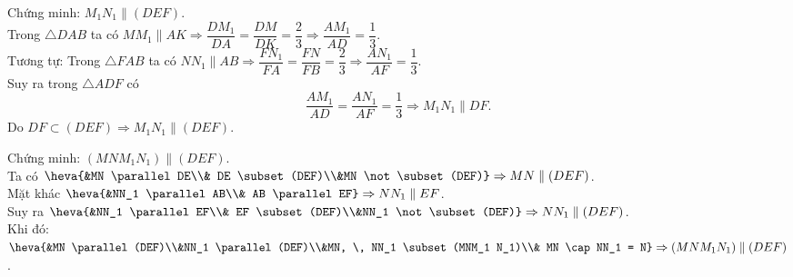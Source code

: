 \begin{bt}
{\begin{listEX}
{\begin{tikzpicture}[line join=round,line cap=round,line width=.6pt,font=\footnotesize,scale=1]
	\end{tikzpicture}}
\item Chứng minh: $M_1 N_1 \parallel (DEF)$.\\
Trong $\triangle DAB$ ta có $MM_1 \parallel AK \Rightarrow \dfrac{DM_1}{DA} = \dfrac{DM}{DK} = \dfrac{2}{3} \Rightarrow \dfrac{AM_1}{AD} = \dfrac{1}{3}$.\\
Tương tự: Trong $\triangle FAB$ ta có $NN_1 \parallel AB \Rightarrow \dfrac{FN_1}{FA} = \dfrac{FN}{FB} = \dfrac{2}{3} \Rightarrow \dfrac{AN_1}{AF} = \dfrac{1}{3}$.\\
Suy ra trong $\triangle ADF$ có $$\dfrac{AM_1}{AD} = \dfrac{AN_1}{AF} = \dfrac{1}{3} \Rightarrow M_1N_1 \parallel DF.$$
Do $DF \subset (DEF) \Rightarrow M_1N_1 \parallel  (DEF)$.
\item Chứng minh: $(MNM_1 N_1) \parallel (DEF)$.\\
Ta có $\heva{&MN \parallel DE\\& DE \subset (DEF)\\&MN \not\subset (DEF)} \Rightarrow MN \parallel (DEF)$.\\
Mặt khác $\heva{&NN_1 \parallel AB\\& AB \parallel EF} \Rightarrow NN_1 \parallel EF$.\\
Suy ra $\heva{&NN_1 \parallel EF\\& EF \subset (DEF)\\&NN_1 \not\subset (DEF)} \Rightarrow NN_1 \parallel (DEF)$.\\
Khi đó: $\heva{&MN \parallel (DEF)\\&NN_1 \parallel (DEF)\\&MN, \, NN_1 \subset (MNM_1 N_1)\\& MN \cap NN_1 = N} \Rightarrow (MNM_1 N_1) \parallel (DEF)$.
\end{listEX}
}	
\end{bt}


